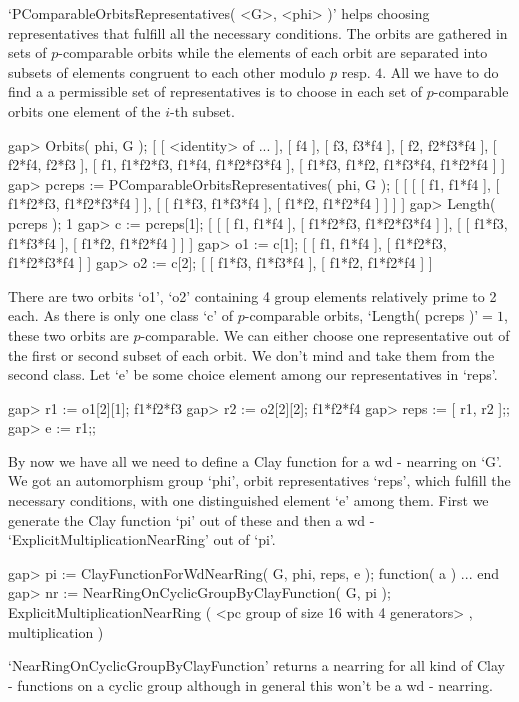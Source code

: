 `PComparableOrbitsRepresentatives( <G>, <phi> )' helps choosing 
representatives that fulfill all the necessary conditions. The orbits are
gathered in sets of $p$-comparable orbits while the elements of each orbit
are separated into subsets of elements congruent to each other modulo $p$ 
resp. $4$. All we have to do find a a permissible set of representatives is
to choose in each set of $p$-comparable orbits one element of the $i$-th 
subset.

\beginexample
    gap> Orbits( phi, G );
    [ [ <identity> of ... ], [ f4 ], [ f3, f3*f4 ], [ f2, f2*f3*f4 ], 
      [ f2*f4, f2*f3 ], [ f1, f1*f2*f3, f1*f4, f1*f2*f3*f4 ], 
      [ f1*f3, f1*f2, f1*f3*f4, f1*f2*f4 ] ]
    gap> pcreps := PComparableOrbitsRepresentatives( phi, G );
    [ [ [ [ f1, f1*f4 ], [ f1*f2*f3, f1*f2*f3*f4 ] ], 
          [ [ f1*f3, f1*f3*f4 ], [ f1*f2, f1*f2*f4 ] ] ] ]
    gap> Length( pcreps );
    1
    gap> c := pcreps[1];
    [ [ [ f1, f1*f4 ], [ f1*f2*f3, f1*f2*f3*f4 ] ], 
      [ [ f1*f3, f1*f3*f4 ], [ f1*f2, f1*f2*f4 ] ] ]
    gap> o1 := c[1];
    [ [ f1, f1*f4 ], [ f1*f2*f3, f1*f2*f3*f4 ] ]
    gap> o2 := c[2];
    [ [ f1*f3, f1*f3*f4 ], [ f1*f2, f1*f2*f4 ] ]
\endexample

There are two orbits `o1', `o2' containing 4 group elements relatively
prime to 2 each. As there is only one class `c' of $p$-comparable orbits,
`Length( pcreps )'$=1$, these two orbits are $p$-comparable. We can either
choose one representative out of the first or second subset of each orbit.
We don't mind and take them from the second class. Let `e' be some choice
element among our representatives in `reps'.

\beginexample
    gap> r1 := o1[2][1];
    f1*f2*f3
    gap> r2 := o2[2][2];
    f1*f2*f4
    gap> reps := [ r1, r2 ];;
    gap> e := r1;;
\endexample

By now we have all we need to define a Clay function for a wd - nearring on
`G'. We got an automorphism group `phi', orbit representatives `reps', which
fulfill the necessary conditions, with one distinguished element `e' among 
them. First we generate the Clay function `pi' out of these and then a wd -
`ExplicitMultiplicationNearRing' out of `pi'.

\beginexample
    gap> pi := ClayFunctionForWdNearRing( G, phi, reps, e );
    function( a ) ... end
    gap> nr := NearRingOnCyclicGroupByClayFunction( G, pi );
    ExplicitMultiplicationNearRing ( <pc group of size 16 with 
    4 generators> , multiplication )
\endexample

`NearRingOnCyclicGroupByClayFunction' returns a nearring for all kind of
Clay - functions on a cyclic group although in general this won't be a wd -
nearring.
    
